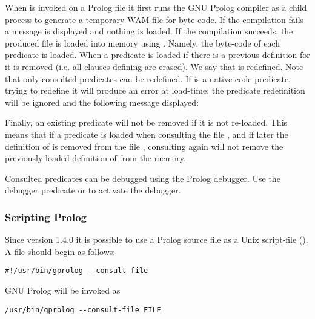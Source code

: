 When   is invoked on a Prolog file it
first runs the GNU Prolog compiler  as a child
process to generate a temporary WAM file for byte-code. If the compilation
fails a message is displayed and nothing is loaded. If the compilation
succeeds, the produced file is loaded into memory using 
. Namely, the byte-code of each predicate is loaded. When a
predicate  is loaded if there is a previous definition
for  it is removed (i.e. all clauses defining
 are erased). We say that  is
redefined. Note that only consulted predicates can be redefined. If
 is a native-code predicate, trying to redefine it will
produce an error at load-time: the predicate redefinition will be ignored
and the following message displayed:


Finally, an existing predicate will not be removed if it is not re-loaded.
This means that if a predicate  is loaded when consulting
the file , and if later the definition of
 is removed from the file , consulting
 again will not remove the previously loaded definition
of  from the memory.

Consulted predicates can be debugged using the Prolog debugger. Use the
debugger predicate  or   to activate the debugger.


\subsubsection{Scripting Prolog}
\label{Scripting-Prolog}
Since version 1.4.0 it is possible to use a Prolog source file as a Unix
script-file (). A  file should begin as follows:

\begin{Code}
\begin{verbatim}
#!/usr/bin/gprolog --consult-file
\end{verbatim}
\end{Code}

GNU Prolog will be invoked as

\begin{Code}
\begin{verbatim}
/usr/bin/gprolog --consult-file FILE
\end{verbatim}
\end{Code}

